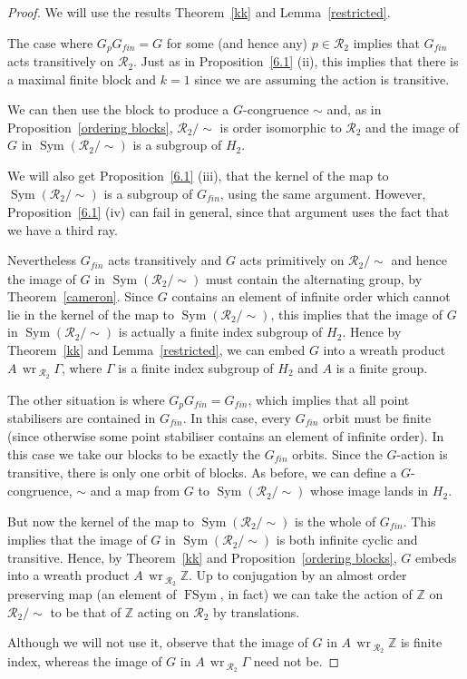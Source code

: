 \documentclass[11pt,a4paper]{amsart}
\theoremstyle{definition}
\theoremstyle{remark}
\newcommand{\Sym}{\operatorname{Sym}}
\newcommand{\FSym}{\operatorname{FSym}}
\newcommand{\Z}{\mathbb Z}
\newcommand{\Ra}{\mathcal{R}}
\newcommand{\gfin}{G_{\textit{fin}}}
\renewcommand{\wr}{\operatorname{\,wr\,}}
\begin{document}
\begin{proof}
	We will use the results Theorem~\ref{kk} and Lemma~\ref{restricted}. 
	
	The case where $G_p\gfin = G$ for some (and hence any) $p \in \Ra_2$ implies that $\gfin$ acts transitively on $\Ra_2$. Just as in Proposition~\ref{6.1} (ii), this implies that there is a maximal finite block and $k=1$ since we are assuming the action is transitive. 
	
	We  can then use the block to produce a $G$-congruence $\sim$ and,  as in Proposition~\ref{ordering blocks}, 	$\Ra_2/\sim$ is order isomorphic to $\Ra_2$ and the image of $G$ in $\Sym(\Ra_2/\sim)$ is a subgroup of $H_2$. 
	
	We will also get Proposition~\ref{6.1} (iii), that the kernel of the map to $\Sym(\Ra_2/\sim)$ is a subgroup of $\gfin$, using the same argument. However, Proposition~\ref{6.1} (iv) can fail in general, since that argument uses the fact that we have a third ray. 
	
	
	Nevertheless $\gfin$ acts transitively and $G$ acts primitively on $\Ra_2/\sim$ and hence the image of $G$ in $\Sym(\Ra_2/\sim)$ must contain the alternating group, by Theorem~\ref{cameron}. Since $G$ contains an element of infinite order which cannot lie in the kernel of the map to $\Sym(\Ra_2/\sim)$, this implies that the image of $G$ in $\Sym(\Ra_2/\sim)$  is actually a finite index subgroup of $H_2$. Hence by Theorem~\ref{kk} and Lemma~\ref{restricted}, we can embed $G$ into a wreath product $A \wr_{\Ra_2} \Gamma$, where $\Gamma$ is a finite index subgroup of $H_2$ and $A$ is a finite group. 
	
	\medspace
	
	The other situation is where $G_p \gfin = \gfin$, which implies that all point stabilisers are contained in $\gfin$. In this case, every $\gfin$ orbit must be finite (since otherwise some point stabiliser contains an element of infinite order). In this case we take our blocks to be exactly the $\gfin$ orbits. Since the $G$-action is transitive, there is only one orbit of blocks. As before, we can define a $G$-congruence, $\sim$ and a map from $G$ to $\Sym(\Ra_2/\sim)$ whose image lands in $H_2$. 
	
	
	But now the kernel of the map to $\Sym(\Ra_2/\sim)$ is the whole of $\gfin$. This implies that the image of $G$ in $\Sym(\Ra_2/\sim)$ is both infinite cyclic and transitive. Hence, by Theorem~\ref{kk} and Proposition~\ref{ordering blocks}, $G$ embeds into a wreath product $A \wr_{\Ra_2} \Z$. Up to conjugation by an almost order preserving map (an element of $\FSym$, in fact) we can take the action of $\Z$ on $\Ra_2/\sim$ to be that of $\Z$ acting on $\Ra_2$ by translations. 
	
	Although we will not use it, observe that the image of $G$ in $A \wr_{\Ra_2} \Z$ is finite index, whereas the image of $G$ in $A \wr_{\Ra_2} \Gamma$ need not be. 
\end{proof}
\end{document}
